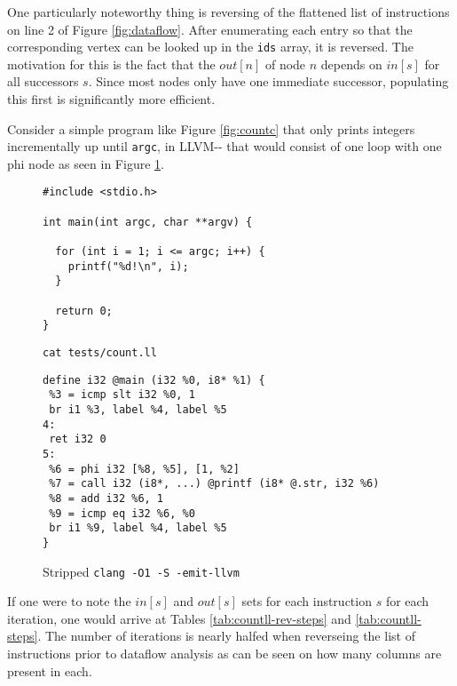\documentclass{article}
\begin{document}
\noindent One particularly noteworthy thing is reversing of the flattened list of instructions on line 2 of Figure \ref{fig:dataflow}. After enumerating each entry so that the corresponding vertex can be looked up in the \texttt{ids} array, it is reversed.
The motivation for this is the fact that the \(\mathit{out}[n]\) of node \(n\) depends on \(\mathit{in}[s]\) for all successors \(s\). Since most nodes only have one immediate successor, populating this first is significantly more efficient.

Consider a simple program like Figure \ref{fig:countc} that only prints integers incrementally up until \texttt{argc}, in LLVM-{}-  that would consist of one loop with one phi node as seen in Figure \ref{fig:count1ll}. 

\begin{figure}[H]
  \begin{minipage}[b]{0.48\textwidth}
     \centering
     \begin{verbatim}
#include <stdio.h>

int main(int argc, char **argv) {

  for (int i = 1; i <= argc; i++) {
    printf("%d!\n", i);
  }

  return 0;
}
     \end{verbatim}
     \caption{\texttt{cat tests/count.ll}}\label{fig:countc}
   \end{minipage}\hfill
   \begin{minipage}[b]{0.48\textwidth}
     \centering
     \begin{verbatim}
define i32 @main (i32 %0, i8* %1) {
 %3 = icmp slt i32 %0, 1
 br i1 %3, label %4, label %5
4:
 ret i32 0
5:
 %6 = phi i32 [%8, %5], [1, %2]
 %7 = call i32 (i8*, ...) @printf (i8* @.str, i32 %6)
 %8 = add i32 %6, 1
 %9 = icmp eq i32 %6, %0
 br i1 %9, label %4, label %5
}
     \end{verbatim}
     \caption{Stripped \texttt{clang -O1 -S -emit-llvm}}\label{fig:count1ll}
   \end{minipage}
\end{figure}

\noindent If one were to note the \(\mathit{in}[s]\) and \(\mathit{out}[s]\) sets for each instruction \(s\) for each iteration, one would arrive at Tables \ref{tab:countll-rev-steps} and \ref{tab:countll-steps}.
The number of iterations is nearly halfed when reverseing the list of instructions prior to dataflow analysis as can be seen on
how many columns are present in each.
\end{document}
